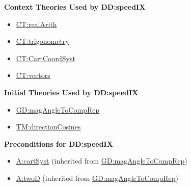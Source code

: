 \documentclass[12pt]{article}
\begin{document}
\noindent \textbf{Context Theories Used by DD:speedIX}

\begin{itemize}
\item \hyperref[CT:realArith]{CT:realArith}
\item \hyperref[CT:trigonometry]{CT:trigonometry}
\item \hyperref[CT:CartCoordSyst]{CT:CartCoordSyst}
\item \hyperref[CT:vectors]{CT:vectors}
\end{itemize}

\noindent \textbf{Initial Theories Used by DD:speedIX}

\begin{itemize}
\item \hyperref[GD:magAngleToCompRep]{GD:magAngleToCompRep}
\item \hyperref[TM:directionCosines]{TM:directionCosines}
\end{itemize}

\noindent \textbf{Preconditions for DD:speedIX}

\begin{itemize}
\item \hyperref[cartSyst]{A:cartSyst} (inherited from \hyperref[GD:magAngleToCompRep]{GD:magAngleToCompRep})
\item \hyperref[twoD]{A:twoD} (inherited from \hyperref[GD:magAngleToCompRep]{GD:magAngleToCompRep})
\end{itemize}
\end{document}
